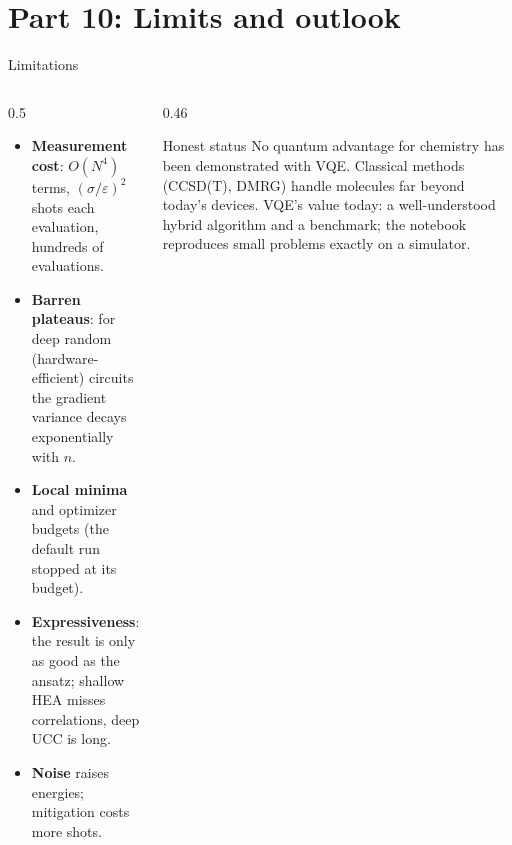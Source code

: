\documentclass[aspectratio=169,11pt]{beamer}
\newcommand{\key}[1]{{\color{qdark}\textbf{#1}}}
\begin{document}
\section{Part 10: Limits and outlook}
\begin{frame}{Limitations}
  \begin{columns}[T]
    \begin{column}{0.5\textwidth}
      \footnotesize
      \begin{itemize}
        \item \key{Measurement cost}: $O(N^4)$ terms, $(\sigma/\varepsilon)^2$ shots each evaluation, hundreds of evaluations.
        \item \key{Barren plateaus}: for deep random (hardware-efficient) circuits the gradient variance decays exponentially with $n$.
        \item \key{Local minima} and optimizer budgets (the default run stopped at its budget).
        \item \key{Expressiveness}: the result is only as good as the ansatz; shallow HEA misses correlations, deep UCC is long.
        \item \key{Noise} raises energies; mitigation costs more shots.
      \end{itemize}
    \end{column}
    \begin{column}{0.46\textwidth}
      \begin{block}{Honest status}
        \small No quantum advantage for chemistry has been demonstrated with VQE. Classical methods (CCSD(T), DMRG) handle molecules far
        beyond today's devices. VQE's value today: a well-understood hybrid algorithm and a benchmark; the notebook reproduces small
        problems exactly on a simulator.
      \end{block}
    \end{column}
  \end{columns}
\end{frame}
\end{document}
